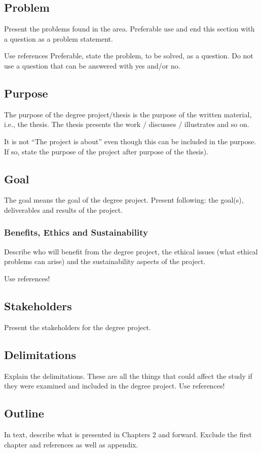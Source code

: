 \subsection{Problem}
Present the problems found in the area. Preferable use and end this section with a question as a problem statement.

Use references
Preferable, state the problem, to be solved, as a question. Do not use a question that can be answered with yes and/or no. 

\subsection{Purpose}
The purpose of the degree project/thesis is the purpose of the written material, i.e., the thesis. The thesis presents the work / discusses / illustrates and so on.

It is not “The project is about” even though this can be included in the purpose. If so, state the purpose of the project after purpose of the thesis).

\subsection{Goal}
The goal means the goal of the degree project. Present following: the goal(s), deliverables and results of the project. 

\subsubsection{Benefits, Ethics and Sustainability}
Describe who will benefit from the degree project, the ethical issues (what ethical problems can arise) and the sustainability aspects of the project.

Use references!

\subsection{Stakeholders}
Present the stakeholders for the degree project.

\subsection{Delimitations}
Explain the delimitations. These are all the things that could affect the study if they were examined and included in the degree project. 
Use references!

\subsection{Outline}
In text, describe what is presented in Chapters 2 and forward. Exclude the first chapter and references as well as appendix. 
